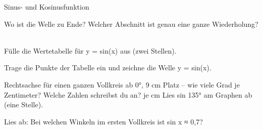 \setcounter{aufgabe}{15}

\begin{aufgabe}{Sinus- und Kosinusfunktion}
\begin{teile}
\teil Wo ist die Welle zu Ende? Welcher Abschnitt ist genau eine ganze Wiederholung?\\ \\ 

\begin{ksys}[xmin=0,xmax=720,ymin=-1.5,ymax=1.5,xstep=90,ystep=0.5,ablesen]\end{ksys}
\teil Fülle die Wertetabelle für y = sin(x) aus (zwei Stellen).

\teil Trage die Punkte der Tabelle ein und zeichne die Welle y = sin(x).

 \begin{ksys}[xmin=0,xmax=360,ymin=-1.2,ymax=1.2,xstep=45,ystep=0.2]\end{ksys}
\teil Rechtsachse für einen ganzen Vollkreis ab 0°, 9 cm Platz – wie viele Grad je Zentimeter? Welche Zahlen schreibst du an? \leerfeld[°] je cm
\teil Lies sin 135° am Graphen ab (eine Stelle).

\begin{ksys}[xmin=0,xmax=360,ymin=-1.2,ymax=1.2,xstep=45,ystep=0.2,ablesen]\end{ksys}
\leerfeld
\teil Lies ab: Bei welchen Winkeln im ersten Vollkreis ist sin x ≈ 0,7?


\end{teile}
\end{aufgabe}
